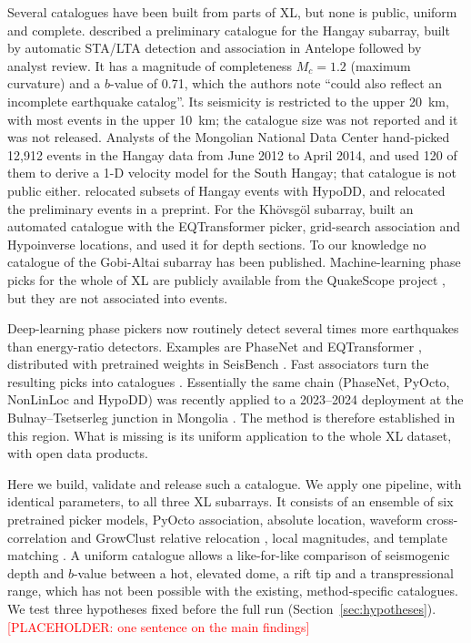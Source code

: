 \documentclass[11pt]{article}
\newcommand{\placeholder}[1]{\textcolor{red}{[PLACEHOLDER: #1]}}
\begin{document}
Several catalogues have been built from parts of XL, but none is public, uniform and complete. \citet{meltzer2019} described a preliminary catalogue for the Hangay subarray, built by automatic STA/LTA detection and association in Antelope followed by analyst review. It has a magnitude of completeness $M_c = 1.2$ (maximum curvature) and a $b$-value of 0.71, which the authors note ``could also reflect an incomplete earthquake catalog''. Its seismicity is restricted to the upper 20~km, with most events in the upper 10~km; the catalogue size was not reported and it was not released. Analysts of the Mongolian National Data Center hand-picked 12,912 events in the Hangay data from June 2012 to April 2014, and \citet{dashdondog2020} used 120 of them to derive a 1-D velocity model for the South Hangay; that catalogue is not public either. \citet{dashdondog2024,dashdondog2026} relocated subsets of Hangay events with HypoDD, and \citet{welkey2019} relocated the preliminary events in a preprint. For the Khövsgöl subarray, \citet{emanov2025} built an automated catalogue with the EQTransformer picker, grid-search association and Hypoinverse locations, and \citet{emanov2026} used it for depth sections. To our knowledge no catalogue of the Gobi-Altai subarray has been published. Machine-learning phase picks for the whole of XL are publicly available from the QuakeScope project \citep{ni2025}, but they are not associated into events.

Deep-learning phase pickers now routinely detect several times more earthquakes than energy-ratio detectors. Examples are PhaseNet \citep{zhu2019} and EQTransformer \citep{mousavi2020}, distributed with pretrained weights in SeisBench \citep{woollam2022}. Fast associators turn the resulting picks into catalogues \citep{zhu2022gamma,munchmeyer2024}. Essentially the same chain (PhaseNet, PyOcto, NonLinLoc and HypoDD) was recently applied to a 2023--2024 deployment at the Bulnay--Tsetserleg junction in Mongolia \citep{manceau2026,manceau2026data}. The method is therefore established in this region. What is missing is its uniform application to the whole XL dataset, with open data products.

Here we build, validate and release such a catalogue. We apply one pipeline, with identical parameters, to all three XL subarrays. It consists of an ensemble of six pretrained picker models, PyOcto association, absolute location, waveform cross-correlation and GrowClust relative relocation \citep{trugman2017}, local magnitudes, and template matching \citep{chamberlain2018,beauce2018}. A uniform catalogue allows a like-for-like comparison of seismogenic depth and $b$-value between a hot, elevated dome, a rift tip and a transpressional range, which has not been possible with the existing, method-specific catalogues. We test three hypotheses fixed before the full run (Section~\ref{sec:hypotheses}). \placeholder{one sentence on the main findings}
\end{document}

